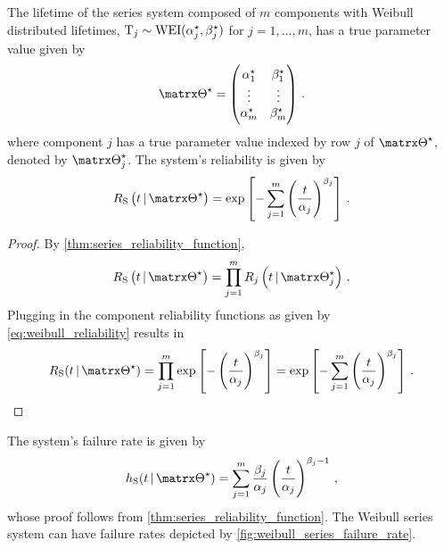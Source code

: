 \documentclass[../main.tex]{subfiles}
\begin{document}
The lifetime of the series system composed of $m$ components with Weibull distributed lifetimes, $\mathrm{T}_j \sim \text{WEI}({\alpha}^{\star}_j, {\beta}^{\star}_j)$ for $j=1,\ldots,m$, has a true parameter value given by
\begin{equation}
    \tparam\sysparam =
    \left(
    \begin{matrix}
        \tparam{\alpha}_1 & \tparam{\beta}_1\\
        \vdots & \vdots\\
        \tparam{\alpha}_m & \tparam{\beta}_m
    \end{matrix}
    \right)\,.
\end{equation}
where component $j$ has a true parameter value indexed by row $j$ of $\tparam\sysparam$, denoted by $\tparam{\sysparam}_j$. The system's reliability is given by
\begin{equation}
\label{eq:sys_weibull_reliability_function}
    \srv_\sv \left(t \given \tparam\sysparam \right)
    = \exp \left[-\sum_{j=1}^{m} \left( \frac{t}{\alpha_j}\right)^{\beta_j} \right]\,.
\end{equation}
\begin{proof}
By \cref{thm:series_reliability_function},
\begin{equation}
    \srv_\sv \left(t \given \tparam\sysparam\right) = \prod_{j=1}^{m} \srv_j \left(t \given \tparam{\sysparam}_j \right)\,.
\end{equation}
Plugging in the component reliability functions as given by \cref{eq:weibull_reliability} results in
\begin{equation}
    \srv_\sv(t \given \tparam\sysparam) = \prod_{j=1}^{m} \exp \left [-\left(\frac{t}{\alpha_j}\right)^{\beta_j} \right ] = \exp \left[-\sum_{j=1}^{m} \left( \frac{t}{\alpha_j}\right)^{\beta_j} \right]\,.
\end{equation}
\end{proof}
The system's failure rate is given by
\begin{equation}
\label{eq:sys_weibull_failure_rate_function}
    \haz_{\sv}(t \given \tparam\sysparam) =
        \sum_{j=1}^{m} \frac{\beta_j}{\alpha_j}\left(\frac{t}{\alpha_j}\right)^{\beta_j-1}\,,
\end{equation}
whose proof follows from \cref{thm:series_reliability_function}. The Weibull series system can have failure rates depicted by \cref{fig:weibull_series_failure_rate}.
\end{document}
